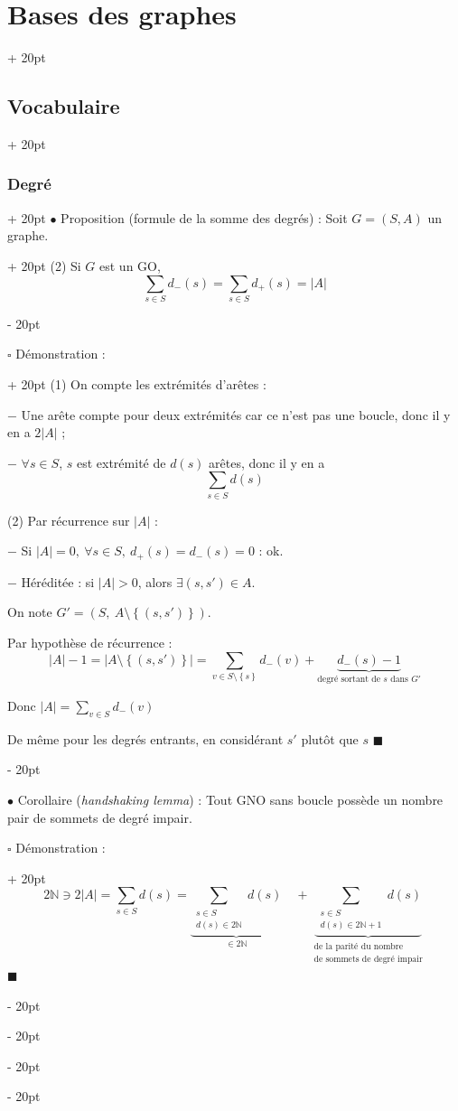 \documentclass[a4paper, 12pt, twoside]{article}
\newcommand{\N}{\mathbb{N}} %
\newcommand{\set}[1]{\left\{ #1 \right\}}
\newcommand{\abs}[1]{\left\lvert #1 \right\rvert}
\newcommand{\ind}[1][20pt]{\advance\leftskip + #1}
\newcommand{\deind}[1][20pt]{\advance\leftskip - #1}
\newenvironment{indt}[2][20pt]{#2 \par \ind[#1]}{\par \deind} %
\begin{document}
\begin{indt}{\section{Bases des graphes}}
\begin{indt}{\subsection{Vocabulaire}}
\begin{indt}{\subsubsection{Degré}}
\begin{indt}{$\bullet$ Proposition (formule de la somme des degrés) : Soit $G = (S, A)$ un graphe.}
                    (2) Si $G$ est un GO,
                    \[
                        \sum_{s \in S} d_-(s) = \sum_{s \in S} d_+(s) = \abs{A}
                    \]
                \end{indt}

                \begin{indt}{$\square$ Démonstration :}
                    (1) On compte les extrémités d'arêtes :

                    $-$ Une arête compte pour deux extrémités car ce n'est pas une boucle, donc il y en a $2\abs A$ ;

                    $-$ $\forall s \in S$, $s$ est extrémité de $d(s)$ arêtes, donc il y en a
                    \[
                        \sum_{s \in S} d(s)
                    \]
                    
                    (2) Par récurrence sur $\abs A$ :

                    $-$ Si $\abs A = 0,\ \forall s \in S,\ d_+(s) = d_-(s) = 0$ : ok.

                    $-$ Héréditée : si $\abs A > 0$, alors $\exists (s, s') \in A$.

                    On note $G' = (S,\ A \setminus \set{(s, s')})$.

                    Par hypothèse de récurrence :
                    \[
                        \abs A - 1 = \abs{A \setminus \set{(s, s')}} = \sum_{v \in S \setminus \set{s}} d_-(v) + \underbrace{d_-(s) - 1}_{\text{degré sortant de $s$ dans $G'$}}
                    \]
                    
                    Donc $\abs A = \displaystyle \sum_{v \in S} d_-(v)$

                    De même pour les degrés entrants, en considérant $s'$ plutôt que $s$
                    $\blacksquare$
                \end{indt}

                \vspace{6pt}
                
                $\bullet$ Corollaire (\textit{handshaking lemma}) : Tout GNO sans boucle possède un nombre pair de sommets de degré impair.

                \begin{indt}{$\square$ Démonstration :}
                    \[
                        2\N \ni 2\abs A
                        = \sum_{s \in S} d(s)
                        = \underbrace{\sum_{\substack{s \in S \\ d(s) \in 2\N}} d(s)}_{\in 2\N} \quad
                        + \underbrace{\sum_{\substack{s \in S \\ d(s) \in 2\N + 1}} d(s)}_{\substack{\text{de la parité du nombre} \\ \text{de sommets de degré impair}}}
                    \]
                    $\blacksquare$
                \end{indt}
                

\end{indt}
\end{indt}
\end{indt}
\end{document}
